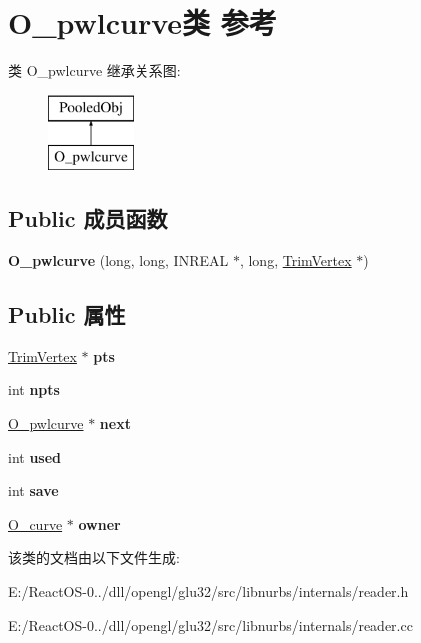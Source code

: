 \hypertarget{class_o__pwlcurve}{}\section{O\+\_\+pwlcurve类 参考}
\label{class_o__pwlcurve}
类 O\+\_\+pwlcurve 继承关系图\+:\begin{figure}[H]
\begin{center}
\leavevmode
\includegraphics[height=2.000000cm]{class_o__pwlcurve}
\end{center}
\end{figure}
\subsection*{Public 成员函数}
\begin{DoxyCompactItemize}
\item 
\mbox{\label{class_o__pwlcurve_a971d1d3f82733c0a8b065c48e0fa8a59}} 
{\bfseries O\+\_\+pwlcurve} (long, long, I\+N\+R\+E\+AL $\ast$, long, \hyperlink{class_trim_vertex}{Trim\+Vertex} $\ast$)
\end{DoxyCompactItemize}
\subsection*{Public 属性}
\begin{DoxyCompactItemize}
\item 
\mbox{\label{class_o__pwlcurve_abea786a8085ea8b0b85284520afc3910}} 
\hyperlink{class_trim_vertex}{Trim\+Vertex} $\ast$ {\bfseries pts}
\item 
\mbox{\label{class_o__pwlcurve_aad3649d63280340d711987d014485664}} 
int {\bfseries npts}
\item 
\mbox{\label{class_o__pwlcurve_afb81976a7b0a4d18bb3349f044f827fc}} 
\hyperlink{class_o__pwlcurve}{O\+\_\+pwlcurve} $\ast$ {\bfseries next}
\item 
\mbox{\label{class_o__pwlcurve_a732ac032f0ee820d55425866f8ee5566}} 
int {\bfseries used}
\item 
\mbox{\label{class_o__pwlcurve_a92f4faeb9d3b5d7e30ae4eefd7776be8}} 
int {\bfseries save}
\item 
\mbox{\label{class_o__pwlcurve_a77e6b789a998ca7da1ed55f827480e14}} 
\hyperlink{struct_o__curve}{O\+\_\+curve} $\ast$ {\bfseries owner}
\end{DoxyCompactItemize}


该类的文档由以下文件生成\+:\begin{DoxyCompactItemize}
\item 
E\+:/\+React\+O\+S-\/0../dll/opengl/glu32/src/libnurbs/internals/reader.\+h\item 
E\+:/\+React\+O\+S-\/0../dll/opengl/glu32/src/libnurbs/internals/reader.\+cc\end{DoxyCompactItemize}
